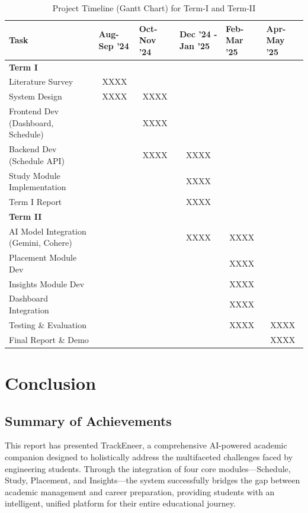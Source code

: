 \documentclass[12pt]{article}
\begin{document}
\begin{table}[t]
\caption{Project Timeline (Gantt Chart) for Term-I and Term-II}
\label{tab:timeline}
\centering
\begin{tabular}{|l|p{2cm}|p{2cm}|p{2cm}|p{2cm}|p{2cm}|}
\hline
\textbf{Task} & \textbf{Aug-Sep '24} & \textbf{Oct-Nov '24} & \textbf{Dec '24 - Jan '25} & \textbf{Feb-Mar '25} & \textbf{Apr-May '25} \\
\hline
\textbf{Term I} & & & & & \\
\hline
Literature Survey & \multicolumn{1}{c|}{XXXX} & & & & \\
\hline
System Design & \multicolumn{1}{c|}{XXXX} & \multicolumn{1}{c|}{XXXX} & & & \\
\hline
Frontend Dev (Dashboard, Schedule) & & \multicolumn{1}{c|}{XXXX} & & & \\
\hline
Backend Dev (Schedule API) & & \multicolumn{1}{c|}{XXXX} & \multicolumn{1}{c|}{XXXX} & & \\
\hline
Study Module Implementation & & & \multicolumn{1}{c|}{XXXX} & & \\
\hline
Term I Report & & & \multicolumn{1}{c|}{XXXX} & & \\
\hline
\textbf{Term II} & & & & & \\
\hline
AI Model Integration (Gemini, Cohere) & & & \multicolumn{1}{c|}{XXXX} & \multicolumn{1}{c|}{XXXX} & \\
\hline
Placement Module Dev & & & & \multicolumn{1}{c|}{XXXX} & \\
\hline
Insights Module Dev & & & & \multicolumn{1}{c|}{XXXX} & \\
\hline
Dashboard Integration & & & & \multicolumn{1}{c|}{XXXX} & \\
\hline
Testing \& Evaluation & & & & \multicolumn{1}{c|}{XXXX} & \multicolumn{1}{c|}{XXXX} \\
\hline
Final Report \& Demo & & & & & \multicolumn{1}{c|}{XXXX} \\
\hline
\end{tabular}
\end{table}

\section{Conclusion}

\subsection{Summary of Achievements}
This report has presented TrackEneer, a comprehensive AI-powered academic companion designed to holistically address the multifaceted challenges faced by engineering students. Through the integration of four core modules—Schedule, Study, Placement, and Insights—the system successfully bridges the gap between academic management and career preparation, providing students with an intelligent, unified platform for their entire educational journey.
\end{document}
